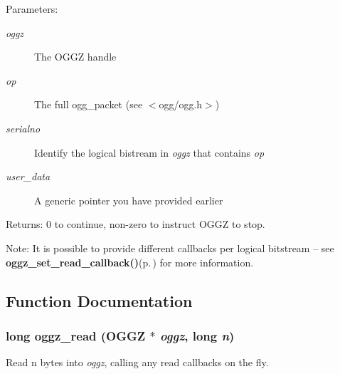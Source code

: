 \begin{Desc}
\item[Parameters:]
\begin{description}
\item[{\em oggz}]The OGGZ handle \item[{\em op}]The full ogg\_\-packet (see $<$ogg/ogg.h$>$) \item[{\em serialno}]Identify the logical bistream in {\em oggz\/} that contains {\em op\/} \item[{\em user\_\-data}]A generic pointer you have provided earlier \end{description}
\end{Desc}
\begin{Desc}
\item[Returns:]0 to continue, non-zero to instruct OGGZ to stop.\end{Desc}
\begin{Desc}
\item[Note:]It is possible to provide different callbacks per logical bitstream -- see {\bf oggz\_\-set\_\-read\_\-callback()}{\rm (p.\,\pageref{group__read__api_a1})} for more information. \end{Desc}


\subsection{Function Documentation}
\subsubsection{\setlength{\rightskip}{0pt plus 5cm}long oggz\_\-read ({\bf OGGZ} $\ast$ {\em oggz}, long {\em n})}\label{group__read__api_a2}


Read n bytes into {\em oggz\/}, calling any read callbacks on the fly. 

